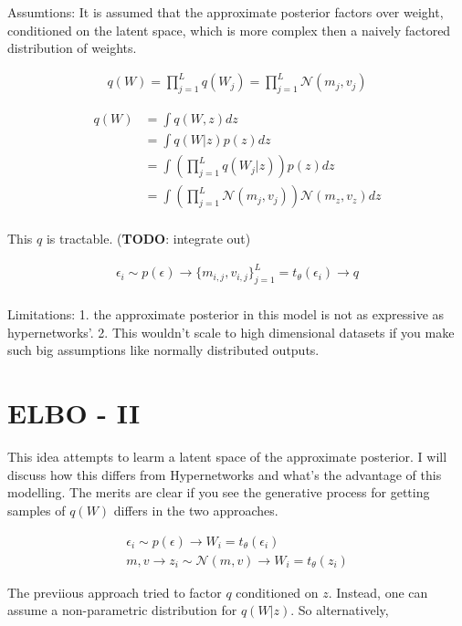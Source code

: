 \documentclass[twoside]{article}
\begin{document}
Assumtions: It is assumed that the approximate posterior factors over weight, conditioned on the latent space, which is more complex then a naively factored distribution of weights. 

\begin{align}
q(W) = \prod_{j=1}^Lq(W_j) = \prod_{j=1}^L \mathcal{N}(m_j,v_j)
\end{align}

\begin{align}
q(W) &= \int q(W,z)dz\\
&= \int q(W|z)p(z)dz\\
&= \int \left(\prod_{j=1}^Lq(W_j|z)\right)p(z)dz\\
&= \int \left(\prod_{j=1}^L\mathcal{N}(m_j,v_j)\right)\mathcal{N}(m_z,v_z)dz\\
\end{align}

This $q$ is tractable. (\textbf{TODO}: integrate out)

\begin{align}
\epsilon_i \sim p(\epsilon) \rightarrow \{m_{i,j},v_{i,j}\}_{j=1}^{L} = t_\theta(\epsilon_i) \rightarrow q\\
\end{align}

Limitations: 1. the approximate posterior in this model is not as expressive as hypernetworks'. 2. This wouldn't scale to high dimensional datasets if you make such big assumptions like normally distributed outputs. 

\section{ELBO - II}

This idea attempts to learm a latent space of the approximate posterior. I will discuss how this differs from Hypernetworks and what's the advantage of this modelling. The merits are clear if you see the generative process for getting samples of $q(W)$ differs in the two approaches. 

\begin{align}
\epsilon_i \sim p(\epsilon) \rightarrow W_i = t_\theta(\epsilon_i)\\
m,v \rightarrow z_i \sim \mathcal{N}(m,v) \rightarrow W_i = t_\theta(z_i)
\end{align}

The previious approach tried to factor $q$ conditioned on $z$. Instead, one can assume a non-parametric distribution for $q(W|z)$. So alternatively,
\end{document}
